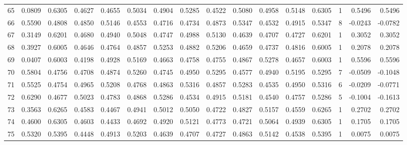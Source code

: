 \begin{tabular}{lrrrrrrrrrrrrrrr}
65  &      0.0809 &  0.6305 &  0.4627 &  0.4655 &  0.5034 &  0.4904 &  0.5285 &  0.4522 &  0.5080 &  0.4958 &   0.5148 &     0.6305 &      1 &                    0.5496 &                     0.5496 \\
66  &      0.5590 &  0.4808 &  0.4850 &  0.5146 &  0.4553 &  0.4716 &  0.4734 &  0.4873 &  0.5347 &  0.4532 &   0.4915 &     0.5347 &      8 &                   -0.0243 &                    -0.0782 \\
67  &      0.3149 &  0.6201 &  0.4680 &  0.4940 &  0.5048 &  0.4747 &  0.4988 &  0.5130 &  0.4639 &  0.4707 &   0.4727 &     0.6201 &      1 &                    0.3052 &                     0.3052 \\
68  &      0.3927 &  0.6005 &  0.4646 &  0.4764 &  0.4857 &  0.5253 &  0.4882 &  0.5206 &  0.4659 &  0.4737 &   0.4816 &     0.6005 &      1 &                    0.2078 &                     0.2078 \\
69  &      0.0407 &  0.6003 &  0.4198 &  0.4928 &  0.5169 &  0.4663 &  0.4758 &  0.4755 &  0.4867 &  0.5278 &   0.4657 &     0.6003 &      1 &                    0.5596 &                     0.5596 \\
70  &      0.5804 &  0.4756 &  0.4708 &  0.4874 &  0.5260 &  0.4745 &  0.4950 &  0.5295 &  0.4577 &  0.4940 &   0.5195 &     0.5295 &      7 &                   -0.0509 &                    -0.1048 \\
71  &      0.5525 &  0.4754 &  0.4965 &  0.5208 &  0.4768 &  0.4863 &  0.5316 &  0.4857 &  0.5283 &  0.4535 &   0.4950 &     0.5316 &      6 &                   -0.0209 &                    -0.0771 \\
72  &      0.6290 &  0.4677 &  0.5023 &  0.4783 &  0.4868 &  0.5286 &  0.4534 &  0.4915 &  0.5181 &  0.4540 &   0.4757 &     0.5286 &      5 &                   -0.1004 &                    -0.1613 \\
73  &      0.3563 &  0.6265 &  0.4583 &  0.4467 &  0.4941 &  0.5012 &  0.5050 &  0.4722 &  0.4827 &  0.5157 &   0.4559 &     0.6265 &      1 &                    0.2702 &                     0.2702 \\
74  &      0.4600 &  0.6305 &  0.4603 &  0.4433 &  0.4692 &  0.4920 &  0.5121 &  0.4773 &  0.4721 &  0.5064 &   0.4939 &     0.6305 &      1 &                    0.1705 &                     0.1705 \\
75  &      0.5320 &  0.5395 &  0.4448 &  0.4913 &  0.5203 &  0.4639 &  0.4707 &  0.4727 &  0.4863 &  0.5142 &   0.4538 &     0.5395 &      1 &                    0.0075 &                     0.0075 \\

\end{tabular}
